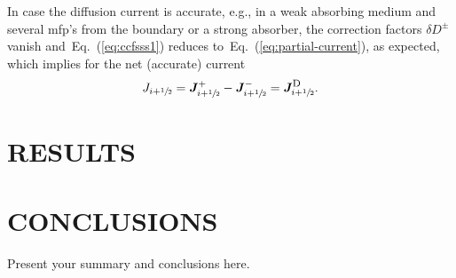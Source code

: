 \documentclass[letterpaper]{physor2020}
\newcommand{\eq}[1]{Eq.~(\ref{#1})}
\newcommand{\jp}{\ensuremath{\bm{J}^+}}
\newcommand{\jm}{\ensuremath{\bm{J}^-}}
\newcommand{\jD}{\ensuremath{\bm{J}^{\textrm{\scriptsize{D}}}}}
\newcommand{\hzi}{\ensuremath{\sfrac{1}{2}}}
\begin{document}
In case the diffusion current is accurate, e.g., in a weak absorbing medium and several mfp's from the boundary or a strong absorber, the correction factors $\delta D^\pm$ vanish and~\eq{eq:ccfsss1} reduces to~\eq{eq:partial-current}, as expected, which implies for the net (accurate) current
\begin{equation}
J _{i+\hzi} = \jp _{i+\hzi} - \jm _{i+\hzi} = \jD _{i+\hzi}.
\end{equation}


\section{RESULTS}
\label{sec:res}


\section{CONCLUSIONS}
\label{sec:conc}

Present your summary and conclusions here.




\end{document}
